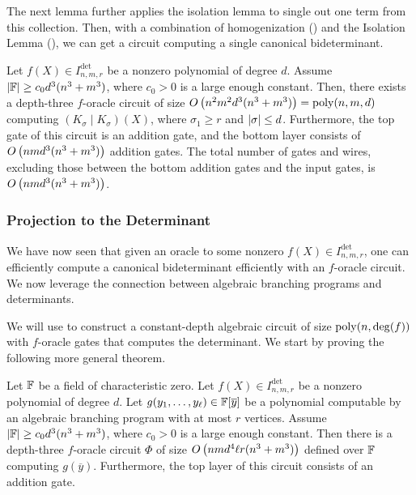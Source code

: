 \documentclass[letterpaper, 11pt]{amsart}
\newif\iffull
\begin{document}
The next lemma further applies the isolation lemma to single out one term from this collection.
\else
  Then, with a combination of homogenization () and the Isolation Lemma (), we can get a circuit computing a single canonical bideterminant.
\fi

\begin{thrm}\label{thrm:bideterminant_canonical_extraction}
    Let $f(X) \in I^{\det}_{n, m, r}$ be a nonzero polynomial of degree $d$.
    Assume $\abs{\mathbb{F}} \geq c_0 d^3(n^3+m^3)$, where $c_0>0$ is a large enough constant.
    Then, there exists a depth-three $f$-oracle circuit of size $O\kern-0.0pt\left(n^2m^2d^3(n^3+m^3)\right) = \operatorname{poly}(n,m,d)$ computing $(K_\sigma \mid K_\sigma)(X)$, where $\sigma_1 \geq r$ and $\abs{\sigma} \leq d$.
    Furthermore, the top gate of this circuit is an addition gate, and the bottom layer consists of $O\kern-0.0pt\left(nmd^3(n^3+m^3)\right)$ addition gates.
    The total number of gates and wires, excluding those between the bottom addition gates and the input gates, is $O\kern-0.0pt\left(nmd^3(n^3+m^3)\right)$.
\end{thrm}

\subsubsection{Projection to the Determinant}

We have now seen that given an oracle to some nonzero $f(X) \in I^{\det}_{n, m, r}$, one can efficiently compute a canonical bideterminant efficiently with an $f$-oracle circuit.
We now leverage the connection between algebraic branching programs and determinants.
\iffull
The remainder of the proof follows~\cite{AF22}, which we include here for completeness.
One key idea is exploiting the close connection between algebraic branching programs and determinants (\Cref{lem:ABP_to_det} and \Cref{lem:homog_ABP}).
\fi

We will use  to construct a constant-depth algebraic circuit of size $\operatorname{poly}(n,\deg(f))$ with $f$-oracle gates that computes the determinant.
We start by proving the following more general theorem.
\begin{thrm}\label{thrm:ABP_det_oracle}
  Let $\mathbb{F}$ be a field of characteristic zero.
  Let $f(X) \in I^{\det}_{n, m, r}$ be a nonzero polynomial of degree $d$.
  Let $g(y_1, \ldots, y_\ell) \in \mathbb{F}[\overline{y}]$ be a polynomial computable by an algebraic branching program with at most $r$ vertices.
  Assume $\abs{\mathbb{F}} \geq c_0 d^3(n^3+m^3)$, where $c_0>0$ is a large enough constant.
  Then there is a depth-three $f$-oracle circuit $\Phi$ of size $O\kern-0.0pt\left(nmd^4\ell r(n^3+m^3)\right)$ defined over $\mathbb{F}$ computing $g(\overline{y})$.
  Furthermore, the top layer of this circuit consists of an addition gate.
\end{thrm}
\end{document}
